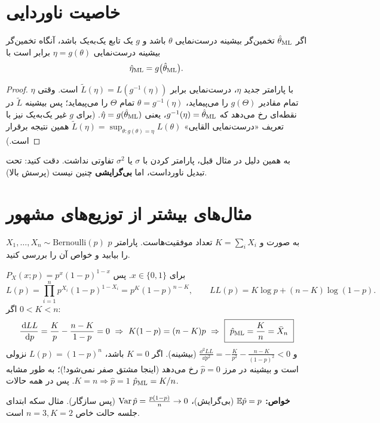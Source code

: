 \section{خاصیت ناوردایی }
\begin{theorem}
اگر $\hat\theta_{\mathrm{ML}}$ تخمین‌گر بیشینه درست‌نمایی $\theta$ باشد و $g$ یک تابع یک‌به‌یک باشد، آنگاه تخمین‌گر بیشینه درست‌نمایی $\eta=g(\theta)$ برابر است با
\[
\hat\eta_{\mathrm{ML}}=g\big(\hat\theta_{\mathrm{ML}}\big).
\]
\end{theorem}
\begin{proof}
با پارامتر جدید $\eta$، درست‌نمایی برابر $\tilde L(\eta)=L(g^{-1}(\eta))$ است. وقتی $\eta$ تمام مقادیر $g(\Theta)$ را می‌پیماید، $\theta=g^{-1}(\eta)$ تمام $\Theta$ را می‌پیماید؛ پس بیشینه $\tilde L$ در نقطه‌ای رخ می‌دهد که $g^{-1}(\eta)=\hat\theta_{\mathrm{ML}}$، یعنی $\hat\eta=g(\hat\theta_{\mathrm{ML}})$. (برای $g$ غیر یک‌به‌یک نیز با تعریف «درست‌نمایی القایی» $\tilde L(\eta)=\sup_{\theta:g(\theta)=\eta}L(\theta)$ همین نتیجه برقرار است.)
\end{proof}
به همین دلیل در مثال قبل، پارامتر کردن با $\sigma$ یا $\sigma^2$ تفاوتی نداشت. دقت کنید:  تحت تبدیل ناورداست، اما \textbf{بی‌گرایشی} چنین نیست (پرسش بالا).

\section{مثال‌های بیشتر از توزیع‌های مشهور}

\begin{example}
$X_1,\ldots,X_n\sim\mathrm{Bernoulli}(p)$ به صورت  و $K=\sum_iX_i$ تعداد موفقیت‌هاست.  پارامتر $p$ را بیابید و خواص آن را بررسی کنید.
\begin{solution}
$P_X(x;p)=p^x(1-p)^{1-x}$ برای $x\in\{0,1\}$. پس
\[
L(p)=\prod_{i=1}^np^{X_i}(1-p)^{1-X_i}=p^K(1-p)^{n-K},\qquad LL(p)=K\log p+(n-K)\log(1-p).
\]
اگر $0<K<n$:
\[
\frac{\dd LL}{\dd p}=\frac Kp-\frac{n-K}{1-p}=0\ \Rightarrow\ K(1-p)=(n-K)p\ \Rightarrow\ \boxed{\ \hat p_\ML=\frac Kn=\bar X_n\ }
\]
و $\frac{\dd^2LL}{\dd p^2}=-\frac{K}{p^2}-\frac{n-K}{(1-p)^2}<0$ (بیشینه). اگر $K=0$ باشد، $L(p)=(1-p)^n$ نزولی است و بیشینه در مرز $\hat p=0$ رخ می‌دهد (اینجا مشتق صفر نمی‌شود!)؛ به طور مشابه $K=n\Rightarrow\hat p=1$. پس در همه حالات $\hat p_{\mathrm{ML}}=K/n$.

\textbf{خواص:} $\mathbb{E}\hat p=p$ (بی‌گرایش)، $\operatorname{Var}\hat p=\frac{p(1-p)}{n}\to0$ (پس سازگار). مثال سکه ابتدای جلسه حالت خاص $n=3,K=2$ است.
\end{solution}
\end{example}

